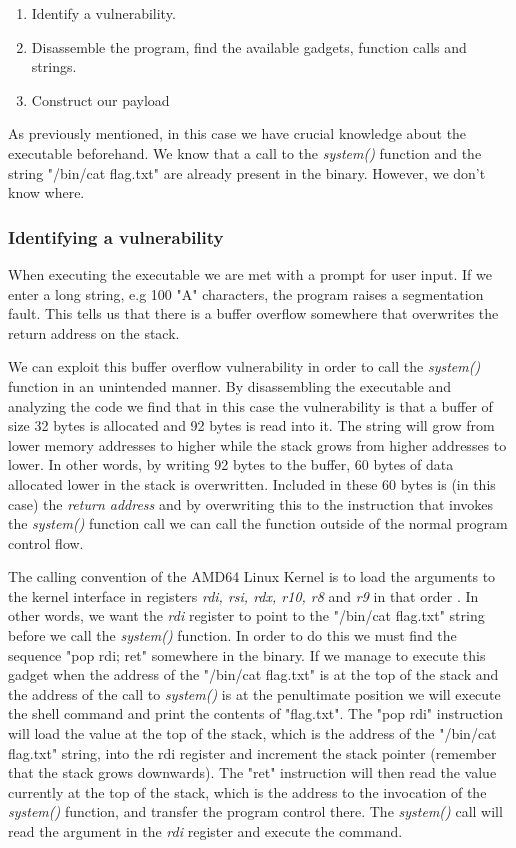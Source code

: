 \begin{enumerate}
	\item Identify a vulnerability.
	\item Disassemble the program, find the available gadgets, function calls and strings.
	\item Construct our payload
\end{enumerate}

As previously mentioned, in this case we have crucial knowledge about the executable
beforehand. We know that a call to the \textit{system()} function and the string
"/bin/cat flag.txt" are already present in the binary. However, we don't know where.

\subsubsection{Identifying a vulnerability}

When executing the executable we are met with a prompt for user input. If we enter a long
string, e.g 100 "A" characters, the program raises a segmentation fault. This tells us
that there is a buffer overflow somewhere that overwrites the return address on the stack.

We can exploit this buffer overflow vulnerability in order to call the \textit{system()}
function in an unintended manner. By disassembling the executable and analyzing the
code we find that in this case the vulnerability is that a buffer of size 32 bytes is
allocated and 92 bytes is read into it. The string will grow from lower memory addresses
to higher while the stack grows from higher addresses to lower. In other words, by writing
92 bytes to the buffer, 60 bytes of data allocated lower in the stack is overwritten.
Included in these 60 bytes is (in this case) the \textit{return address} and by
overwriting this to the instruction that invokes the \textit{system()} function call we
can call the function outside of the normal program control flow.

The calling convention of the AMD64 Linux Kernel is to load the arguments to the kernel
interface in registers \textit{rdi, rsi, rdx, r10, r8} and \textit{r9} in that order \cite{system-v-abi}.
In other words, we want the \textit{rdi} register to point to the "/bin/cat flag.txt" string
before we call the \textit{system()} function. In order to do this we must find the sequence
"pop rdi; ret" somewhere in the binary. If we manage to execute this gadget when the
address of the "/bin/cat flag.txt" is at the top of the stack and the address of the call to
\textit{system()} is at the penultimate position we will execute the shell command and print
the contents of "flag.txt". The "pop rdi" instruction will load the value at the top of
the stack, which is the address of the "/bin/cat flag.txt" string, into the rdi register
and increment the stack pointer (remember that the stack grows downwards). The "ret"
instruction will then read the value currently at the top of the stack, which is the
address to the invocation of the \textit{system()} function, and transfer the program
control there. The \textit{system()} call will read the argument in the \textit{rdi}
register and execute the command.

